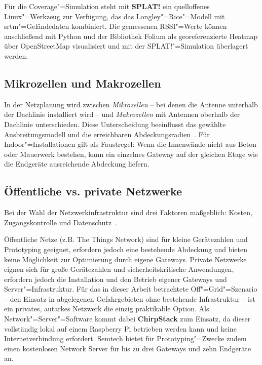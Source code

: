 Für die Coverage"=Simulation steht mit \textbf{SPLAT!} ein quelloffenes Linux"=Werkzeug
zur Verfügung, das das Longley"=Rice"=Modell mit \acrfull{srtm}"=Geländedaten kombiniert.
Die gemessenen RSSI"=Werte können anschließend mit Python und der Bibliothek Folium
als georeferenzierte Heatmap über OpenStreetMap visualisiert und mit der
SPLAT!"=Simulation überlagert werden.

\subsection{Mikrozellen und Makrozellen}
\label{subsec:zellen}

In der Netzplanung wird zwischen \textit{Mikrozellen} -- bei denen die Antenne
unterhalb der Dachlinie installiert wird -- und \textit{Makrozellen} mit Antennen
oberhalb der Dachlinie unterschieden. Diese Unterscheidung beeinflusst das
gewählte Ausbreitungsmodell und die erreichbaren Abdeckungsradien~\cite{walter2006radio}.
Für Indoor"=Installationen gilt als Faustregel: Wenn die Innenwände nicht aus Beton oder
Mauerwerk bestehen, kann ein einzelnes Gateway auf der gleichen Etage wie die
Endgeräte ausreichende Abdeckung liefern.

\subsection{Öffentliche vs. private Netzwerke}
\label{subsec:netzwerktypen}

Bei der Wahl der Netzwerkinfrastruktur sind drei Faktoren maßgeblich: Kosten,
Zugangskontrolle und Datenschutz~\cite{LoRaModulationBasics}.

Öffentliche Netze (z.B. The Things Network) sind für kleine Gerätezahlen und
Prototyping geeignet, erfordern jedoch eine bestehende Abdeckung und bieten keine
Möglichkeit zur Optimierung durch eigene Gateways. Private Netzwerke eignen sich
für große Gerätezahlen und sicherheitskritische Anwendungen, erfordern jedoch die
Installation und den Betrieb eigener Gateways und Server"=Infrastruktur. Für das
in dieser Arbeit betrachtete Off"=Grid"=Szenario -- den Einsatz in abgelegenen
Gefahrgebieten ohne bestehende Infrastruktur -- ist ein privates, autarkes Netzwerk
die einzig praktikable Option. Als Network"=Server"=Software kommt dabei \textbf{ChirpStack}
zum Einsatz, da dieser vollständig lokal auf einem Raspberry Pi betrieben werden kann
und keine Internetverbindung erfordert. Semtech bietet für Prototyping"=Zwecke zudem
einen kostenlosen Network Server für bis zu drei Gateways und zehn Endgeräte an.





